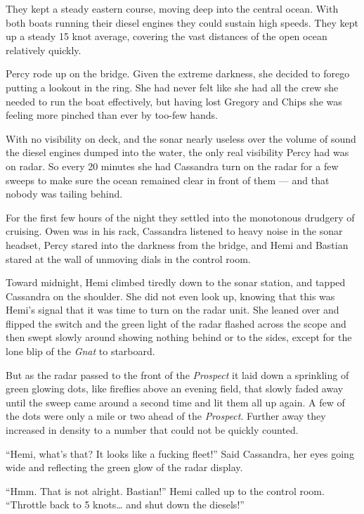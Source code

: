 \documentclass[
]{scrbook}
\begin{document}
They kept a steady eastern course, moving deep into the central ocean.
With both boats running their diesel engines they could sustain high
speeds. They kept up a steady 15 knot average, covering the vast
distances of the open ocean relatively quickly.

Percy rode up on the bridge. Given the extreme darkness, she decided to
forego putting a lookout in the ring. She had never felt like she had
all the crew she needed to run the boat effectively, but having lost
Gregory and Chips she was feeling more pinched than ever by too-few
hands.

With no visibility on deck, and the sonar nearly useless over the volume
of sound the diesel engines dumped into the water, the only real
visibility Percy had was on radar. So every 20 minutes she had Cassandra
turn on the radar for a few sweeps to make sure the ocean remained clear
in front of them --- and that nobody was tailing behind.

For the first few hours of the night they settled into the monotonous
drudgery of cruising. Owen was in his rack, Cassandra listened to heavy
noise in the sonar headset, Percy stared into the darkness from the
bridge, and Hemi and Bastian stared at the wall of unmoving dials in the
control room.

Toward midnight, Hemi climbed tiredly down to the sonar station, and
tapped Cassandra on the shoulder. She did not even look up, knowing that
this was Hemi's signal that it was time to turn on the radar unit. She
leaned over and flipped the switch and the green light of the radar
flashed across the scope and then swept slowly around showing nothing
behind or to the sides, except for the lone blip of the \emph{Gnat} to
starboard.

But as the radar passed to the front of the \emph{Prospect} it laid down
a sprinkling of green glowing dots, like fireflies above an evening
field, that slowly faded away until the sweep came around a second time
and lit them all up again. A few of the dots were only a mile or two
ahead of the \emph{Prospect}. Further away they increased in density to
a number that could not be quickly counted.

``Hemi, what's that? It looks like a fucking fleet!'' Said Cassandra,
her eyes going wide and reflecting the green glow of the radar display.

``Hmm. That is not alright. Bastian!'' Hemi called up to the control
room. ``Throttle back to 5 knots\ldots{} and shut down the diesels!''
\end{document}
